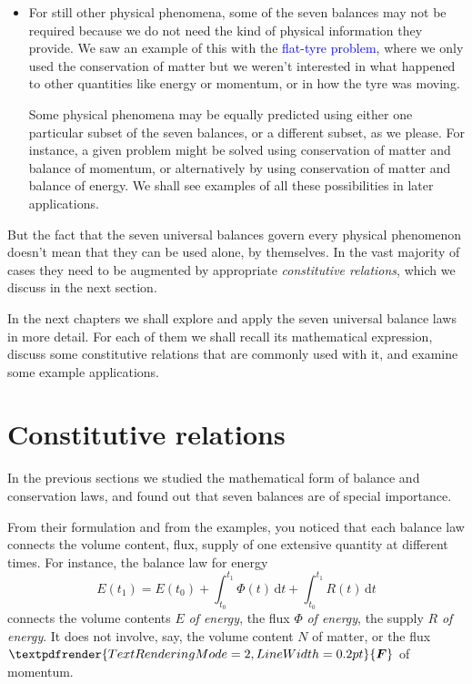 \documentclass[a4paper,12pt,%
onecolumn,oneside,%
british%
]{memoir}
\renewcommand*{\bm}[1]{\textpdfrender{TextRenderingMode=2,LineWidth=0.2pt}{\boldsymbol{#1}}}
\newcommand*{\di}{\mathrm{d}}%
\renewcommand*{\|}[1][]{\nonscript\:#1\vert\nonscript\:\mathopen{}}
\newcommand*{\sect}{\S}%
\renewcommand*{\autoref}[2]{\sidepar{\vspace{-1ex}\footnotesize{\color{blue}\faIcon{%
angle-right%
}\enskip\sect~\ref{#1} page~\pageref{#1}}}\textcolor{blue}{#2}}
\newcommand*{\yti}{t_{0}}
\newcommand*{\ytf}{t_{1}}
\newcommand*{\yN}{N}
\newcommand*{\yE}{E}
\newcommand*{\yH}{\varPhi}%
\newcommand*{\yR}{R}%
\newcommand*{\yF}{\bm{F}}
\begin{document}
\begin{itemize}[para]
\item For still other physical phenomena, some of the seven balances may not be required because we do not need the kind of physical information they provide. We saw an example of this with the \autoref{sec:example_conservation_moving}{flat-tyre problem}, where we only used the conservation of matter but we weren't interested in what happened to other quantities like energy or momentum, or in how the tyre was moving.

  Some physical phenomena may be equally predicted using either one particular subset of the seven balances, or a different subset, as we please. For instance, a given problem might be solved using conservation of matter and balance of momentum, or alternatively by using conservation of matter and balance of energy. We shall see examples of all these possibilities in later applications.
\end{itemize}

\medskip


But the fact that the seven universal balances govern every physical phenomenon doesn't mean that they can be used alone, by themselves. In the vast majority of cases they need to be augmented by appropriate \emph{constitutive relations}, which we discuss in the next section.

\medskip

In the next chapters we shall explore and apply the seven universal balance laws in more detail. For each of them we shall recall its mathematical expression, discuss some constitutive relations that are commonly used with it, and examine some example applications.


\section{Constitutive relations}
\label{sec:constitutive}

In the previous sections we studied the mathematical form of balance and conservation laws, and found out that seven balances are of special importance.

From their formulation and from the examples, you noticed that each balance law connects the volume content, flux, supply of one extensive quantity at different times. For instance, the balance law for energy
\begin{equation*}
  \yE(\ytf) = \yE(\yti)
  + \int_{\yti}^{\ytf}\!\!\yH(t)\, \di t
  + \int_{\yti}^{\ytf}\!\!\yR(t)\,\di t
\end{equation*}
connects the volume contents $\yE$ \emph{of energy}, the flux $\yH$ \emph{of energy}, the supply $\yR$ \emph{of energy}. It does not involve, say, the volume content $\yN$ of matter, or the flux $\yF$ of momentum.
\end{document}
